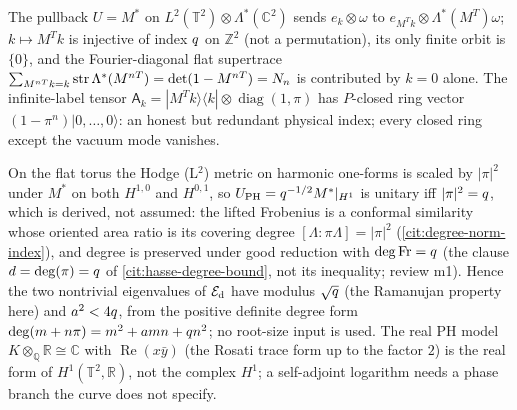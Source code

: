 \begin{proposition}
\label{prop:fourier-shift-flat-trace}
The pullback $U = M^*$ on $L^2(\mathbb T^2)\otimes\Lambda^*(\mathbb C^2)$ sends $e_k\otimes\omega$ to %
$e_{M^Tk}\otimes\Lambda^*(M^T)\omega$; $k\mapsto M^Tk$ is injective of index $q$ on $\mathbb Z^2$ %
(not a permutation), its only finite orbit is $\{0\}$, and the Fourier-diagonal flat supertrace
$\sum_{M^{nT}k = k}\operatorname{str}\Lambda^*(M^{nT}) = \det(1-M^{nT}) = N_{n}$ is contributed by $k = 0$ %
alone. The infinite-label tensor $\mathsf A_k = |M^Tk\rangle\langle k|\otimes\operatorname{diag}(1,\pi)$
has $P$-closed ring vector $(1-\pi^n)|0,\dots,0\rangle$: an honest but redundant physical
index; every closed ring except the vacuum mode vanishes.
\end{proposition}

\begin{theorem}
\label{thm:elliptic-ph-unitary}
On the flat torus the Hodge (L$^2$) metric on harmonic one-forms is scaled by $|\pi|^2$ under
$M^*$ on both $H^{1,0}$ and $H^{0,1}$, so $U_{\mathrm{PH}} = q^{-1/2}M^*|_{H^1}$ is unitary iff
$|\pi|^2 = q$, which is derived, not assumed: the lifted Frobenius is a conformal similarity
whose oriented area ratio is its covering degree $[\Lambda:\pi\Lambda] = |\pi|^2$ (\cref{cit:degree-norm-index}), %
and degree is preserved under good reduction with $\deg\mathrm{Fr} = q$ (the clause $d = \deg(\pi) = q$ of
\cref{cit:hasse-degree-bound}, not its inequality; review m1).
Hence the two nontrivial eigenvalues of $\mathcal E_{\mathrm d}$ have modulus $\sqrt{q}$ (the Ramanujan
property here) and $a^2<4q$, from the positive definite degree form $\deg(m+n\pi) =
m^2+amn+q n^2$; no root-size input is used. The real PH model $K\otimes_{\mathbb Q}\mathbb R\cong\mathbb C$
with $\operatorname{Re}(x\bar y)$ (the Rosati trace form up to the factor $2$) is the real form of
$H^1(\mathbb T^2,\mathbb R)$, not the complex $H^1$; a self-adjoint logarithm needs a phase branch
the curve does not specify.
\end{theorem}

